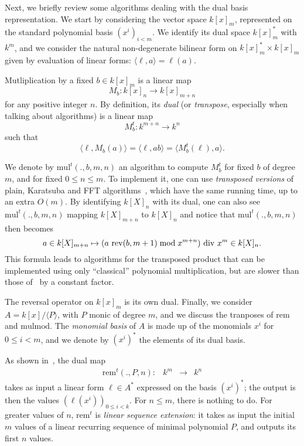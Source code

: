 \documentclass[12pt]{article}
\def\mul {\ensuremath{\mathrm{mul}}}
\def\rem {\ensuremath{\mathrm{rem}}}
\def\mulmod {\ensuremath{\mathrm{mulmod}}}
\def\rev {\ensuremath{\mathrm{rev}}}
\newcommand{\ang}[1]{\langle#1\rangle}
\begin{document}
Next, we briefly review some algorithms dealing with the dual basis
representation.  We start by considering the vector space $k[x]_m$,
represented on the standard polynomial basis $(x^i)_{i<m}$. We
identify its dual space $k[x]_m^\ast$ with $k^m$, and we consider the
natural non-degenerate bilinear form on $k[x]_m^\ast\times k[x]_m$
given by evaluation of linear forms: $\ang{\ell,a} = \ell(a)$.

Mutliplication by a fixed $b\in k[x]_m$ is a linear map
\begin{equation*}
  M_b: k[x]_n \to k[x]_{m+n}
\end{equation*}
for any positive integer $n$. By definition, its \emph{dual} (or
\emph{transpose}, especially when talking about algorithms) is a
linear map
\begin{equation*}
  M_b^t : k^{m+n} \to k^n
\end{equation*}
such that
\begin{equation*}
  \ang{\ell,M_b(a)} = \ang{\ell,ab} = \ang{M_b^t(\ell),a}.
\end{equation*}

We denote by $\mul^t(.,b,m,n)$ an algorithm to compute $M_b^t$ for
fixed $b$ of degree $m$, and for fixed $0\le n\le m$. To implement it,
one can use \emph{transposed versions} of plain, Karatsuba and FFT
algorithms~\cite{bostan+lecerf+schost:tellegen,hanrot+quercia+zimmermann},
which have the same running time, up to an extra $O(m)$.  By
identifying $k[X]_n$ with its dual, one can also see $\mul^t(.,b,m,n)$
mapping $k[X]_{m+n}$ to $k[X]_{n}$ and notice that $\mul^t(.,b,m,n)$
then becomes $$a \in k[X]_{m+n} \mapsto (a\ \rev(b,m+1) \bmod
x^{m+n}){\rm~div~}x^{m} \in k[X]_n.$$ This formula leads to algorithms
for the transposed product that can be implemented using only
``classical'' polynomial multiplication, but are slower than those
of~\cite{bostan+lecerf+schost:tellegen,hanrot+quercia+zimmermann} by a
constant factor.

The reversal operator on $k[x]_m$ is its own dual. Finally, we
consider $A=k[x]/\ang{P}$, with $P$ monic of degree $m$, and
we discuss the tranposes of $\rem$ and $\mulmod$.  The \emph{monomial
  basis} of $A$ is made up of the monomials $x^i$ for $0\le i<m$, and
we denote by $(x^i)^\ast$ the elements of its dual basis.

As shown in~\cite{bostan+lecerf+schost:tellegen}, the dual map
$$
\begin{array}{cccc}
\rem^t(.,P,n): &k^m& \to &k^n
\end{array}$$ 
takes as input a linear form $\ell\in A^\ast$ expressed on the basis $(x^i)^\ast$; the output
is then the values $(\ell(x^i))_{0 \le i < k}$. For $n \le m$, there
is nothing to do. For greater values of $n$, $\rem^t$ is \emph{linear sequence extension}: it takes as input the initial $m$ values of a linear recurring sequence of minimal polynomial $P$, and outputs its first $n$ values.
\end{document}
